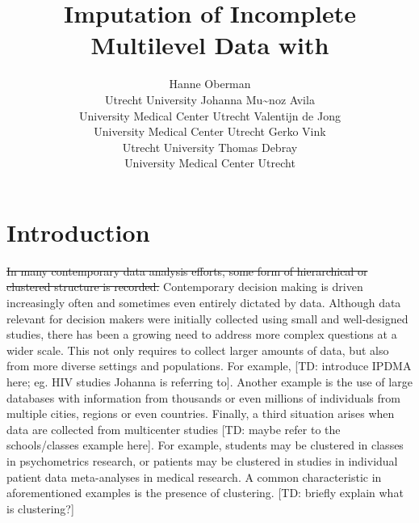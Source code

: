 \documentclass[
]{jss}
\author{
Hanne Oberman\\Utrecht University \And Johanna Mu\textasciitilde noz
Avila\\University Medical Center Utrecht \AND Valentijn de
Jong\\University Medical Center Utrecht \And Gerko Vink\\Utrecht
University \AND Thomas Debray\\University Medical Center Utrecht
}
\title{Imputation of Incomplete Multilevel Data with \pkg{mice}}
\begin{document}
\hypertarget{introduction}{%
\section{Introduction}\label{introduction}}

\sout{In many contemporary data analysis efforts, some form of
hierarchical or clustered structure is recorded.} Contemporary decision
making is driven increasingly often and sometimes even entirely dictated
by data. Although data relevant for decision makers were initially
collected using small and well-designed studies, there has been a
growing need to address more complex questions at a wider scale. This
not only requires to collect larger amounts of data, but also from more
diverse settings and populations. For example, {[}TD: introduce IPDMA
here; eg. HIV studies Johanna is referring to{]}. Another example is the
use of large databases with information from thousands or even millions
of individuals from multiple cities, regions or even countries. Finally,
a third situation arises when data are collected from multicenter
studies {[}TD: maybe refer to the schools/classes example here{]}. For
example, students may be clustered in classes in psychometrics research,
or patients may be clustered in studies in individual patient data
meta-analyses in medical research. A common characteristic in
aforementioned examples is the presence of clustering. {[}TD: briefly
explain what is clustering?{]}
\end{document}
